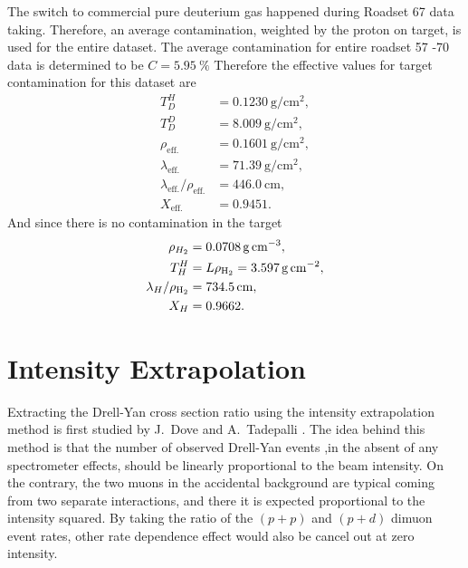 \documentclass[../main.tex]{subfiles}
\begin{document}
The switch to commercial pure deuterium gas happened during Roadset 67 data taking. Therefore,
an average contamination, weighted by the proton on target, is used for the entire dataset.
The average contamination for entire roadset 57 -70 data is determined to be $C=\SI{5.95}{\percent}$
Therefore the effective values for target contamination for this dataset are
\begin{equation}
	\begin{split}
		T_D^H &= \SI{0.1230}{\g\per\cm\squared}, \\
		T_D^D &= \SI{8.009}{\g\per\cm\squared},\\
		\rho_{\mathrm{eff.}} & = \SI{0.1601}{\g\per\cm\squared},\\
		\lambda_{\mathrm{eff.}} &= \SI{71.39}{\g\per\cm\squared},\\
		\lambda_{\mathrm{eff.}}/\rho_{\mathrm{eff.}} &= \SI{446.0}{\cm},\\
		X_{\mathrm{eff.}} &= 0.9451.
	\end{split}
\end{equation}
And since there is no contamination in the  target
\begin{equation}
	\begin{split}
		\rho_{H_2} &= \SI{0.0708}{\g\per\cm\cubed},\\
		T_H^H &= L\rho_{\ce{H_2}} = \SI{3.597}{\g\per\cm\squared},\\
		\lambda_H/\rho_{\ce{H_2}} &= \SI{734.5}{\cm},\\
		X_H &=0.9662.
	\end{split}
\end{equation}

\section{Intensity Extrapolation}
\label{sec:extrapolation}
Extracting the Drell-Yan cross section ratio using the intensity extrapolation method
is first studied by J.~Dove \cite{dove2020} and A.~Tadepalli \cite{tadepalli2019}.
The idea behind this method is that the number of observed Drell-Yan
events ,in the absent of any spectrometer effects, should be linearly proportional to the beam
intensity. On the contrary, the two muons in the accidental background are typical coming from
two separate interactions, and there it is expected proportional to the intensity squared. By taking the ratio of the
$(p+p)$ and $(p+d)$ dimuon event rates, other rate dependence effect would also be cancel out
at zero intensity.
\end{document}

